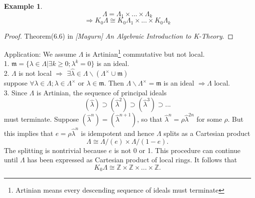 \documentclass[11pt]{article}
\newtheorem{ex}[thm]{Example}
\newcommand{\intg}{\mathbb Z}
\newcommand{\scm}{{\mathfrak m}}
\newcommand{\Lrta}{\Longrightarrow}
\begin{document}
\begin{ex}
$$
\Lambda=\Lambda_1 \times ...\times \Lambda_k
$$
$$
\Lrta K_0 \Lambda \cong K_0\Lambda_1\times...\times K_0\Lambda_k
$$
\end{ex}
\begin{proof}
Theorem(6.6) in \textit{[Magurn] An Algebraic Introduction to K-Theory}.
\end{proof}
Application:
We assume $\Lambda$ is Artinian\footnote{Artinian means every descending sequence of ideals must terminate} commutative but  not local. \\
1. $\scm=\{\lambda \in \Lambda|\exists k\geq 0; \lambda^k=0\}$ is an ideal.\\
2. $\Lambda $ is not local $\Lrta$ $\exists \hat{\lambda}\in \Lambda \backslash (\Lambda^{\times}\cup \scm)$\\
suppose $\forall \lambda\in \Lambda; \lambda\in \Lambda^\times$ or $\lambda \in \scm$. Then $\Lambda\backslash \Lambda^\times=\scm$ is an ideal $\Lrta\Lambda$ local. \\
3. Since $\Lambda$ is Artinian, the sequence of principal ideals 
$$
(\hat{\lambda})\supset (\hat{\lambda}^2)\supset (\hat{\lambda}^3)\supset...
$$
must terminate.
Suppose $(\hat{\lambda}^n)=(\hat{\lambda}^{n+1})$, so that $\hat{\lambda}^n=\rho \hat{\lambda}^{2n}$ for some $\rho$. But this implies that $e=\rho \hat{\lambda}^n$ is idempotent and hence $\Lambda$ splits as a Cartesian product
$$
\Lambda\cong \Lambda/(e)\times \Lambda/(1-e).
$$
The splitting is nontrivial because $e$ is not 0 or 1. This procedure can continue until $\Lambda$ has been expressed as Cartesian product of local rings.
It follows that 
$$
K_0 \Lambda\cong \intg\times \intg\times...\times\intg.
$$
\end{document}
